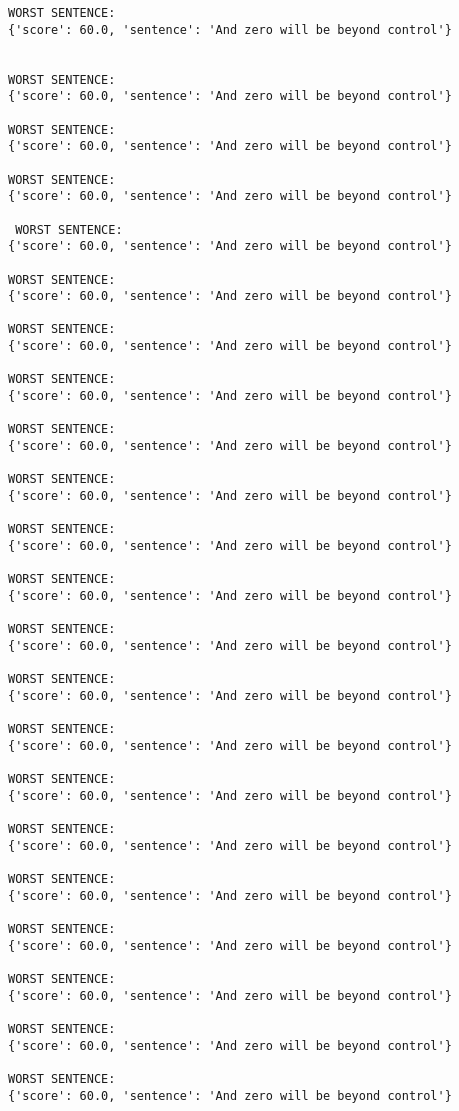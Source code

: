 \documentclass[12pt,a4paper,oneside]{book}
\begin{document}
\begin{verbatim}
WORST SENTENCE:
{'score': 60.0, 'sentence': 'And zero will be beyond control'}
 
 
WORST SENTENCE:
{'score': 60.0, 'sentence': 'And zero will be beyond control'}

WORST SENTENCE:
{'score': 60.0, 'sentence': 'And zero will be beyond control'}

WORST SENTENCE:
{'score': 60.0, 'sentence': 'And zero will be beyond control'}

 WORST SENTENCE:
{'score': 60.0, 'sentence': 'And zero will be beyond control'}

WORST SENTENCE:
{'score': 60.0, 'sentence': 'And zero will be beyond control'}

WORST SENTENCE:
{'score': 60.0, 'sentence': 'And zero will be beyond control'}

WORST SENTENCE:
{'score': 60.0, 'sentence': 'And zero will be beyond control'}

WORST SENTENCE:
{'score': 60.0, 'sentence': 'And zero will be beyond control'}

WORST SENTENCE:
{'score': 60.0, 'sentence': 'And zero will be beyond control'}

WORST SENTENCE:
{'score': 60.0, 'sentence': 'And zero will be beyond control'}

WORST SENTENCE:
{'score': 60.0, 'sentence': 'And zero will be beyond control'}

WORST SENTENCE:
{'score': 60.0, 'sentence': 'And zero will be beyond control'}

WORST SENTENCE:
{'score': 60.0, 'sentence': 'And zero will be beyond control'}

WORST SENTENCE:
{'score': 60.0, 'sentence': 'And zero will be beyond control'}

WORST SENTENCE:
{'score': 60.0, 'sentence': 'And zero will be beyond control'}

WORST SENTENCE:
{'score': 60.0, 'sentence': 'And zero will be beyond control'}

WORST SENTENCE:
{'score': 60.0, 'sentence': 'And zero will be beyond control'}

WORST SENTENCE:
{'score': 60.0, 'sentence': 'And zero will be beyond control'}

WORST SENTENCE:
{'score': 60.0, 'sentence': 'And zero will be beyond control'}

WORST SENTENCE:
{'score': 60.0, 'sentence': 'And zero will be beyond control'}

WORST SENTENCE:
{'score': 60.0, 'sentence': 'And zero will be beyond control'}


\end{verbatim}
\end{document}

